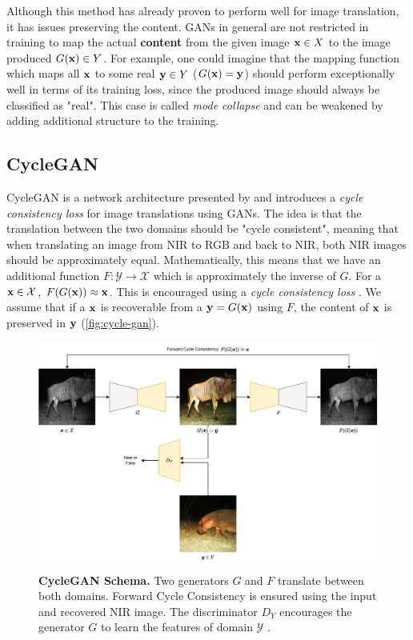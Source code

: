 Although this method has already proven to perform well for image translation, it has issues preserving the content.
GANs in general are not restricted in training to map the actual \textbf{content} from the given image
$\mathbf{x} \in X$ to the image produced $G(\mathbf{x}) \in Y$.
For example, one could imagine that the mapping function which maps all $\mathbf{x}$ to some real $\mathbf{y} \in Y$ ($G(\mathbf{x}) = \mathbf{y}$) should perform exceptionally well in terms of its training loss, since the produced image should always be classified as "real".
This case is called \textit{mode collapse} and can be weakened by adding additional structure to the training.

\subsection{CycleGAN}
\label{sec:methods-cycle-gan}

CycleGAN is a network architecture presented by \citeauthor*{cyclegan-original} and introduces a \textit{cycle consistency loss} for image translations using GANs.
The idea is that the translation between the two domains should be "cycle consistent", meaning that when translating an image from NIR to RGB and back
to NIR, both NIR images should be approximately equal.
Mathematically, this means that we have an additional function $F: \mathcal{Y} \to \mathcal{X}$ which is approximately the inverse of $G$. For a $\mathbf{x} \in \mathcal{X}$, $F(G(\mathbf{x})) \approx \mathbf{x}$.
This is encouraged using a \textit{cycle consistency loss} \parencite{cyclegan-original}. We assume that if a $\mathbf{x}$ is recoverable from a $\mathbf{y} = G(\mathbf{x})$ using $F$, the content of $\mathbf{x}$
is preserved in $\mathbf{y}$ \parencite{cyclegan-original} (\autoref{fig:cycle-gan}).

\begin{figure}[h]
   \includegraphics[width=\textwidth]{gfx/CycleGAN.pdf}
   \caption{
      \textbf{CycleGAN Schema.} Two generators $G$ and $F$ translate between both domains. Forward Cycle Consistency is ensured using the input and recovered NIR image.
      The discriminator $D_Y$ encourages the generator $G$ to learn the features of domain $\mathcal{Y}$ \parencite{cyclegan-original,mehri}.
   }
   \label{fig:cycle-gan}
\end{figure}

